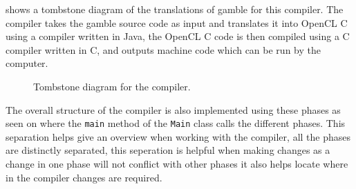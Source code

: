  shows a tombstone diagram of the translations of \gls{gamble} for this compiler.
The compiler takes the \gls{gamble} source code as input and translates it into OpenCL C using a compiler written in Java, the OpenCL C code is then compiled using a C compiler written in C, and outputs machine code which can be run by the computer.
\begin{figure}[!ht]
\centering
{}
\caption{Tombstone diagram for the compiler.}
\label{fig:tombstone}
\end{figure}


The overall structure of the compiler is also implemented using these phases as seen on  where the \texttt{main} method of the \texttt{Main} class calls the different phases.
This separation helps give an overview when working with the compiler, all the phases are distinctly separated, this seperation is helpful when making changes as a change in one phase will not conflict with other phases it also helps locate where in the compiler changes are required.

